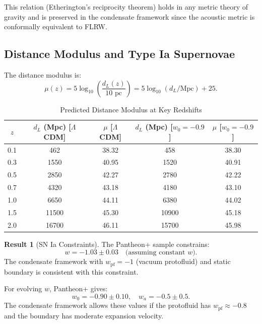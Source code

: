 \documentclass[11pt,a4paper]{article}
\newcommand{\wpf}{\ensuremath{w_{\mathrm{pf}}}}
\theoremstyle{definition}
\newtheorem{result}{Result}
\theoremstyle{remark}
\begin{document}
This relation (Etherington's reciprocity theorem) holds in any metric theory of gravity and is preserved in the condensate framework since the acoustic metric is conformally equivalent to FLRW.

\subsection{Distance Modulus and Type Ia Supernovae}
\label{sec:SNIa}

The distance modulus is:
\begin{equation}
\mu(z) = 5\log_{10}\left(\frac{d_L(z)}{10 \text{ pc}}\right) = 5\log_{10}(d_L/\text{Mpc}) + 25.
\end{equation}

\begin{table}[H]
\centering
\caption{Predicted Distance Modulus at Key Redshifts}
\label{tab:distance_modulus}
\begin{tabular}{@{}ccccc@{}}
\toprule
$z$ & $d_L$ (Mpc) [$\Lambda$CDM] & $\mu$ [$\Lambda$CDM] & $d_L$ (Mpc) [$w_0=-0.9$] & $\mu$ [$w_0=-0.9$] \\
\midrule
0.1 & 462 & 38.32 & 458 & 38.30 \\
0.3 & 1550 & 40.95 & 1520 & 40.91 \\
0.5 & 2850 & 42.27 & 2780 & 42.22 \\
0.7 & 4320 & 43.18 & 4180 & 43.10 \\
1.0 & 6650 & 44.11 & 6380 & 44.02 \\
1.5 & 11500 & 45.30 & 10900 & 45.18 \\
2.0 & 16700 & 46.11 & 15700 & 45.98 \\
\bottomrule
\end{tabular}
\end{table}

\begin{result}[SN Ia Constraints]
\label{result:SNIa}
The Pantheon+ sample \cite{Scolnic2022} constrains:
\begin{equation}
w = -1.03 \pm 0.03 \quad \text{(assuming constant } w\text{)}.
\end{equation}
The condensate framework with $\wpf = -1$ (vacuum protofluid) and static boundary is consistent with this constraint.

For evolving $w$, Pantheon+ gives:
\begin{equation}
w_0 = -0.90 \pm 0.10, \quad w_a = -0.5 \pm 0.5.
\end{equation}
The condensate framework allows these values if the protofluid has $\wpf \approx -0.8$ and the boundary has moderate expansion velocity.
\end{result}
\end{document}
